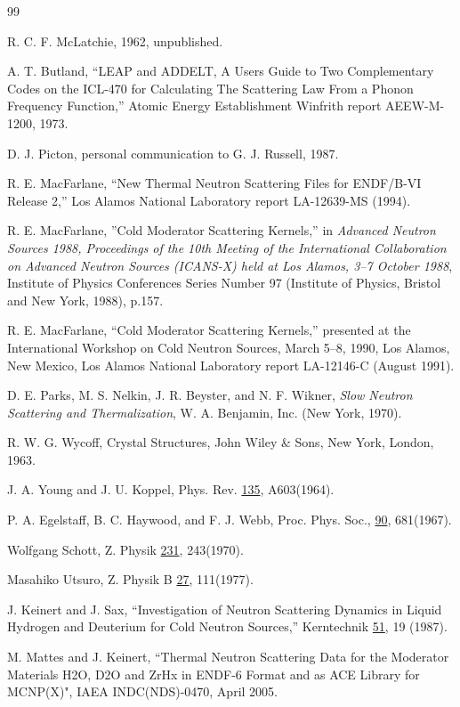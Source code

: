\documentclass[11pt,twoside]{NJOYMan}
\begin{document}
\begin{thebibliography}{99}
\begin{singlespace}
 R. C. F. McLatchie, 1962, unpublished.

 A. T. Butland, ``LEAP and ADDELT, A Users Guide
  to Two Complementary Codes on the ICL-470 for Calculating The Scattering
  Law From a Phonon Frequency Function,''       Atomic Energy Establishment
  Winfrith report AEEW-M-1200, 1973.

 D. J. Picton, personal communication to G. J. Russell, 1987.

 R. E. MacFarlane, ``New Thermal Neutron Scattering Files
  for ENDF/B-VI Release 2,'' Los Alamos National Laboratory report
  LA-12639-MS (1994).

 R. E. MacFarlane, ''Cold Moderator Scattering
  Kernels,'' in {\it Advanced Neutron Sources 1988, Proceedings of
  the 10th Meeting of the International Collaboration on Advanced
  Neutron Sources (ICANS-X) held at Los Alamos, 3--7 October 1988},
  Institute of Physics Conferences Series Number 97 (Institute of
  Physics, Bristol and New York, 1988), p.157.

 R. E. MacFarlane, ``Cold Moderator Scattering
  Kernels,'' presented at the International Workshop on Cold Neutron
  Sources, March 5--8, 1990, Los Alamos, New Mexico, Los Alamos
  National Laboratory report LA-12146-C (August 1991).

 D. E. Parks,
  M.  S. Nelkin, J. R. Beyster, and N. F. Wikner,
  {\it Slow Neutron Scattering and Thermalization}, W. A. Benjamin, Inc.
  (New York, 1970).

 R. W. G. Wycoff, Crystal Structures, John Wiley \& Sons,
  New York, London, 1963.

 J. A. Young and J. U. Koppel, Phys. Rev. \underline{135},
  A603(1964).

 P. A. Egelstaff, B. C. Haywood, and F. J. Webb,
  Proc. Phys. Soc., \underline{90}, 681(1967).

 Wolfgang Schott, Z. Physik \underline{231}, 243(1970).

 Masahiko Utsuro, Z. Physik B \underline{27}, 111(1977).

 J. Keinert and J. Sax, ``Investigation of Neutron Scattering
  Dynamics in Liquid Hydrogen and Deuterium for Cold Neutron Sources,''
  Kerntechnik \underline{51}, 19 (1987).

 M. Mattes and J. Keinert, ``Thermal Neutron Scattering
  Data for the Moderator Materials H2O, D2O and ZrHx in ENDF-6 Format
  and as ACE Library for MCNP(X)", IAEA INDC(NDS)-0470, April 2005.


\end{singlespace}
\end{thebibliography}
\end{document}
